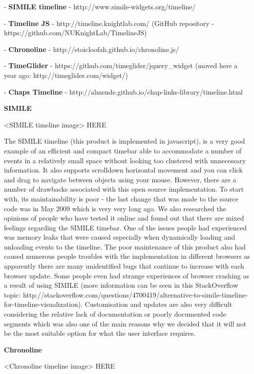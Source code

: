 \documentclass{l3proj}
\begin{document}
- \textbf{SIMILE timeline} - http://www.simile-widgets.org/timeline/

- \textbf{Timeline JS} - http://timeline.knightlab.com/ (GitHub repository - https://github.com/NUKnightLab/TimelineJS)

- \textbf{Chronoline} - http://stoicloofah.github.io/chronoline.js/

- \textbf{TimeGlider} - https://github.com/timeglider/jquery_widget (moved here a year ago: http://timeglider.com/widget/)

- \textbf{Chaps Timeline} - http://almende.github.io/chap-links-library/timeline.html



\textbf{SIMILE}

<SIMILE timeline image> HERE

The SIMILE timeline (this product is implemented in javascript), is a very good example of an efficient and compact timebar able to accommodate a number of events in a relatively small space without looking too clustered with unnecessary information. It also supports scrolldown horizontal movement and  you can click and drag to navigate between objects using your mouse. However, there are a number of drawbacks associated with this open source implementation. To start with, its maintainability is poor - the last change that was made to the source code was in May 2009 which is very very long ago. We also researched the opinions of people who have tested it online and found out that there are mixed feelings regarding the SIMILE timebar. One of the issues people had experienced was memory leaks that were caused especially when dynamically loading and unloading events to the timeline. The poor maintenance of this product also had caused numerous people troubles with the implementation in different browsers as apparently there are many unidentified bugs that continue to increase with each browser update. Some people even had strange experiences of browser crashing as a result of using SIMILE (more information can be seen in this StackOverflow topic: http://stackoverflow.com/questions/4700419/alternative-to-simile-timeline-for-timeline-visualization). Customisation and updates are also very difficult considering the relative lack of documentation or poorly documented code segments which was also one of the main reasons why we decided that it will not be the most suitable option for what the user interface requires.


\textbf{Chronoline}

<Chronoline timeline image> HERE
\end{document}
